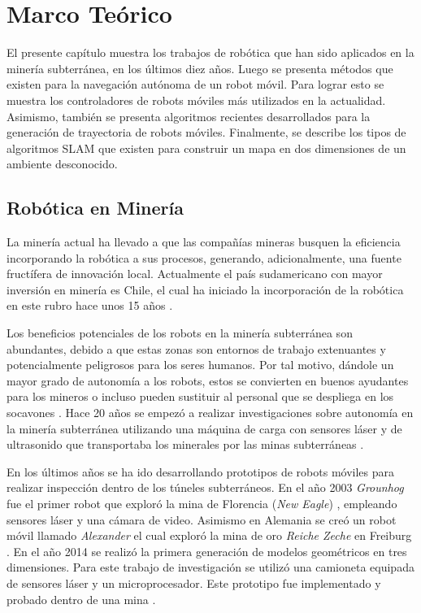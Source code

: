 \chapter{Marco Teórico}
El presente capítulo muestra los trabajos de robótica que han sido aplicados en 
la minería subterránea, en los últimos diez años. Luego se presenta métodos
que existen para la navegación autónoma de un robot móvil. Para lograr esto se muestra
los controladores de robots móviles más utilizados en la actualidad. Asimismo, también
se presenta algoritmos recientes desarrollados para la generación de trayectoria de 
robots móviles. Finalmente, se describe los tipos de algoritmos SLAM que existen para 
construir un mapa en dos dimensiones de un ambiente desconocido.

\section{Rob\'otica en Miner\'ia}
La minería actual ha llevado a que las compañías mineras busquen la eficiencia 
incorporando la robótica a sus procesos, generando, adicionalmente, una fuente 
fructífera de innovación local. Actualmente el país sudamericano con mayor inversión 
en minería es Chile, el cual ha iniciado la incorporación de la robótica en este rubro hace 
unos 15 años \cite{Carmona2014}.

Los beneficios potenciales de los robots en la minería subterránea son abundantes, debido 
a que estas zonas son entornos de trabajo extenuantes y potencialmente peligrosos para 
los seres humanos. Por tal motivo, dándole un mayor grado de autonomía a los robots, estos 
se convierten en buenos ayudantes para los mineros o incluso pueden sustituir al personal 
que se despliega en los socavones \cite{Carmona2014}. Hace 20 años se empezó a realizar 
investigaciones sobre autonomía en la minería subterránea utilizando una máquina de carga 
con sensores láser y de ultrasonido que transportaba los minerales por las minas 
subterráneas \cite{Scheding1999}. 

En los últimos años se ha ido desarrollando prototipos de robots móviles para 
realizar inspección dentro de los túneles subterráneos. En el año 2003 \textit{Grounhog}
fue el primer robot que exploró la mina de Florencia (\textit{New Eagle}) 
\cite{Thrun2004}, empleando sensores láser y una cámara de video. Asimismo en Alemania se 
creó un robot móvil llamado \textit{Alexander} el cual exploró la mina de oro 
\textit{Reiche Zeche} en Freiburg \cite{Grehl2015}. En el año 2014 se realizó la primera 
generación de modelos geométricos en tres dimensiones. Para este trabajo de investigación 
se utilizó una camioneta equipada de sensores láser y un microprocesador. Este prototipo 
fue implementado y probado dentro de una mina \cite{Zlot2014}.

